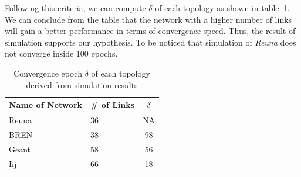 Following this criteria, we can compute $\delta$ of each topology as shown in table~\ref{table:conv_epoch}. We can conclude from the table that the network with a higher number of links will gain a better performance in terms of convergence speed. Thus, the result of simulation supports our hypothesis. To be noticed that simulation of {\it Reuna} does not converge inside 100 epochs.
\begin{table}
\centering
\caption{Convergence epoch $\delta$ of each topology derived from simulation results}
\begin{tabular}{llc}
	\hline
	Name of Network &  \# of Links & $\delta$ \\
    	\hline
    	Reuna & 36 & NA\\
    	BREN & 38 & 98\\
    	Geant & 58 & 56\\
    	Iij & 66 & 18\\
    	\hline
\end{tabular}
\label{table:conv_epoch}
\end{table}


